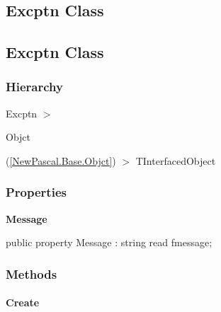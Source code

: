 \documentclass{report}
\newif\ifpdf
\begin{document}
\subsection*{\large{\textbf{Excptn Class}}\normalsize\hspace{1ex}\hrulefill}
\else
\subsection*{Excptn Class}
\fi
\label{NewPascal.Base.Excptn}
\subsubsection*{\large{\textbf{Hierarchy}}\normalsize\hspace{1ex}\hfill}
Excptn {$>$} \begin{ttfamily}Objct\end{ttfamily}(\ref{NewPascal.Base.Objct}) {$>$} 
TInterfacedObject
\subsubsection*{\large{\textbf{Properties}}\normalsize\hspace{1ex}\hfill}
\begin{list}{}{
\setlength{\itemindent}{0cm}
\setlength{\listparindent}{0cm}
\setlength{\leftmargin}{\evensidemargin}
\addtolength{\leftmargin}{\tmplength}
\settowidth{\labelsep}{X}
\addtolength{\leftmargin}{\labelsep}
\setlength{\labelwidth}{\tmplength}
}
\label{NewPascal.Base.Excptn-Message}
\item[\textbf{Message}\hfill]
\ifpdf
\begin{flushleft}
\fi
\begin{ttfamily}
public property Message : string read fmessage;\end{ttfamily}

\ifpdf
\end{flushleft}
\fi


\par  \end{list}
\subsubsection*{\large{\textbf{Methods}}\normalsize\hspace{1ex}\hfill}
\paragraph*{Create}\hspace*{\fill}
\end{document}
